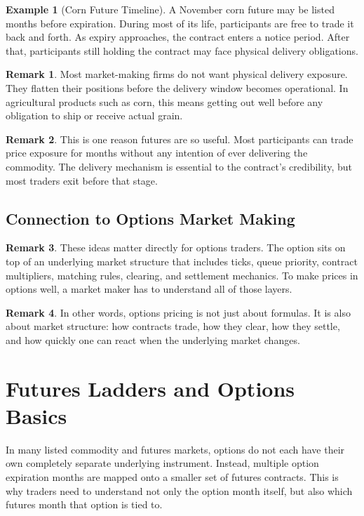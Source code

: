 \documentclass[11pt]{article}
\theoremstyle{definition}
\newtheorem{example}{Example}[section]
\newtheorem{remark}{Remark}[section]
\begin{document}
\begin{example}[Corn Future Timeline]
A November corn future may be listed months before expiration. During most of its life, participants are free to trade it back and forth. As expiry approaches, the contract enters a notice period. After that, participants still holding the contract may face physical delivery obligations.
\end{example}

\begin{remark}
Most market-making firms do not want physical delivery exposure. They flatten their positions before the delivery window becomes operational. In agricultural products such as corn, this means getting out well before any obligation to ship or receive actual grain.
\end{remark}

\begin{remark}
This is one reason futures are so useful. Most participants can trade price exposure for months without any intention of ever delivering the commodity. The delivery mechanism is essential to the contract's credibility, but most traders exit before that stage.
\end{remark}

\subsection{Connection to Options Market Making}

\begin{remark}
These ideas matter directly for options traders. The option sits on top of an underlying market structure that includes ticks, queue priority, contract multipliers, matching rules, clearing, and settlement mechanics. To make prices in options well, a market maker has to understand all of those layers.
\end{remark}

\begin{remark}
In other words, options pricing is not just about formulas. It is also about market structure: how contracts trade, how they clear, how they settle, and how quickly one can react when the underlying market changes.
\end{remark}

\section{Futures Ladders and Options Basics}

In many listed commodity and futures markets, options do not each have their own completely separate underlying instrument. Instead, multiple option expiration months are mapped onto a smaller set of futures contracts. This is why traders need to understand not only the option month itself, but also which futures month that option is tied to.
\end{document}
